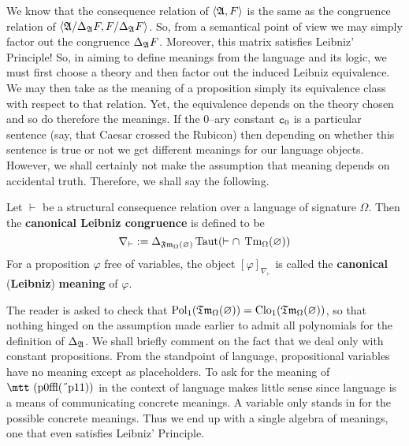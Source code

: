 We know that the consequence relation of $\langle \mathfrak{A}, F\rangle$ is the
same as the congruence relation of $\langle \mathfrak{A}/\Delta_{\mathfrak{A}}F,
F/\Delta_{\mathfrak{A}}F\rangle$. So, from a semantical point of view we may
simply factor out the congruence $\Delta_{\mathfrak{A}}F$. Moreover, this
matrix satisfies Leibniz' Principle! So, in aiming to define
meanings from the language and its logic, we must first choose a
theory and then factor out the induced Leibniz equivalence. We may
then take as the meaning of a proposition simply its equivalence
class with respect to that relation. Yet, the equivalence depends
on the theory chosen and so do therefore the meanings. If the
0--ary constant $\mbox{\tt c}_0$ is a particular sentence (say,
that Caesar crossed the Rubicon) then depending on whether this
sentence is true or not we get different meanings for our language
objects. However, we shall certainly not make the assumption that
meaning depends on accidental truth. Therefore, we shall say the
following.
\begin{defn}
\index{$\nabla_{\vdash}$}%
Let $\vdash$ be a structural consequence relation over a language
of signature $\Omega$. Then the \textbf{canonical Leibniz congruence}
is defined to be
\begin{equation}
\nabla_{\vdash} := \Delta_{\mathfrak{Fm}_{\Omega}(\varnothing)}
\operatorname{Taut}(\vdash \cap\; \operatorname{Tm}_{\Omega}(\varnothing))
\end{equation}
For a proposition $\varphi$ free of variables, the object
$[\varphi]_{\nabla_{\vdash}}$ is called the \textbf{canonical}
(\textbf{Leibniz}) \textbf{meaning} of $\varphi$.
\end{defn}
The reader is asked to check that
$\operatorname{Pol}_1(\mathfrak{Tm}_{\Omega}(\varnothing))
= \operatorname{Clo}_1(\mathfrak{Tm}_{\Omega}(\varnothing))$, so that nothing
hinged on the assumption made earlier to admit all polynomials
for the definition of $\Delta_{\mathfrak{A}}$. We shall briefly comment on
the fact that we deal only with constant propositions. From the
standpoint of language, propositional variables have no meaning
except as placeholders. To ask for the meaning of
$\mbox{\mtt (p0\symbol{31}(\symbol{5}p11))}$ in the context of
language makes little sense since language is a means of communicating 
concrete meanings. A variable only stands in for the possible concrete
meanings. Thus we end up with a single algebra of meanings,
one that even satisfies Leibniz' Principle.

